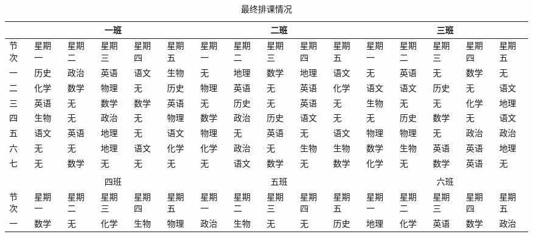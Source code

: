 \documentclass[bwprint]{cumcmthesis}
\begin{document}
\begin{landscape}
	\begin{longtable}{llllllllllllllll}
		\caption{\label{tab:class_result}最终排课情况}\\
		\toprule
		& \multicolumn{5}{c}{一班}                & \multicolumn{5}{c}{二班}                & \multicolumn{5}{c}{三班} \\
		\midrule
		节次    & 星期一   & 星期二   & 星期三   & 星期四   & 星期五   & 星期一   & 星期二   & 星期三   & 星期四   & 星期五   & 星期一   & 星期二   & 星期三   & 星期四   & 星期五 \\
		\midrule
		一     & 历史    & 政治    & 英语    & 语文    & 生物    & 无     & 地理    & 数学    & 地理    & 语文    & 无     & 英语    & 无     & 数学    & 无 \\
		二     & 化学    & 数学    & 物理    & 无     & 历史    & 物理    & 英语    & 无     & 英语    & 化学    & 语文    & 语文    & 历史    & 无     & 语文 \\
		三     & 英语    & 无     & 数学    & 数学    & 英语    & 无     & 历史    & 无     & 英语    & 无     & 生物    & 无     & 无     & 化学    & 地理 \\
		四     & 生物    & 无     & 政治    & 无     & 物理    & 数学    & 政治    & 历史    & 语文    & 无     & 无     & 历史    & 数学    & 无     & 语文 \\
		五     & 语文    & 英语    & 地理    & 无     & 语文    & 物理    & 无     & 英语    & 无     & 语文    & 物理    & 物理    & 无     & 政治    & 政治 \\
		六     & 无     & 无     & 地理    & 语文    & 化学    & 化学    & 政治    & 无     & 生物    & 生物    & 数学    & 生物    & 英语    & 英语    & 地理 \\
		七     & 无     & 数学    & 无     & 无     & 无     & 无     & 语文    & 数学    & 无     & 数学    & 化学    & 无     & 数学    & 英语    & 无 \\
		\midrule
		&       &       &       &       &       &       &       &       &       &       &       &       &       &       &  \\
		\midrule
		& \multicolumn{5}{c}{四班}                & \multicolumn{5}{c}{五班}                & \multicolumn{5}{c}{六班} \\
		\midrule
		节次    & 星期一   & 星期二   & 星期三   & 星期四   & 星期五   & 星期一   & 星期二   & 星期三   & 星期四   & 星期五   & 星期一   & 星期二   & 星期三   & 星期四   & 星期五 \\
		\midrule
		一     & 数学    & 无     & 化学    & 生物    & 物理    & 政治    & 生物    & 无     & 无     & 历史    & 地理    & 化学    & 英语    & 数学    & 政治 \\

\end{longtable}
\end{landscape}
\end{document}
